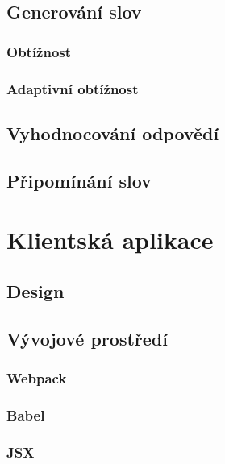 \documentclass[a4paper,11pt,titlepage,fleqn]{article}
\begin{document}
    \subsection{Generování slov}

        \subsubsection{Obtížnost}
        \subsubsection{Adaptivní obtížnost}
        

    \subsection{Vyhodnocování odpovědí}

    \subsection{Připomínání slov}


\newpage
\section{Klientská aplikace}

    \subsection{Design}

    \subsection{Vývojové prostředí}
        \subsubsection{Webpack}

        \subsubsection{Babel}
        \subsubsection{JSX}
\end{document}
